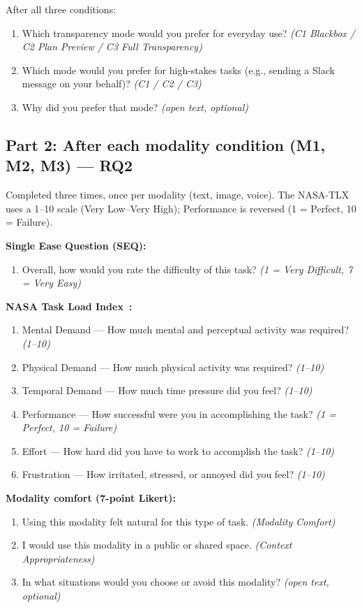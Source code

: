 \documentclass[sigconf, anonymous]{acmart}
\begin{document}
After all three conditions:
\begin{enumerate}
  \item[8.] Which transparency mode would you prefer for everyday use? \emph{(C1 Blackbox / C2 Plan Preview / C3 Full Transparency)}
  \item[9.] Which mode would you prefer for high-stakes tasks (e.g., sending a Slack message on your behalf)? \emph{(C1 / C2 / C3)}
  \item[10.] Why did you prefer that mode? \emph{(open text, optional)}
\end{enumerate}

\subsection*{Part 2: After each modality condition (M1, M2, M3) --- RQ2}

Completed three times, once per modality (text, image, voice). The NASA-TLX uses a 1--10 scale (Very Low--Very High); Performance is reversed (1 = Perfect, 10 = Failure).

\textbf{Single Ease Question (SEQ):}
\begin{enumerate}
  \item Overall, how would you rate the difficulty of this task? \emph{(1 = Very Difficult, 7 = Very Easy)}
\end{enumerate}

\textbf{NASA Task Load Index~\cite{Hart1988}:}
\begin{enumerate}
  \item[2.] Mental Demand --- How much mental and perceptual activity was required? \emph{(1--10)}
  \item[3.] Physical Demand --- How much physical activity was required? \emph{(1--10)}
  \item[4.] Temporal Demand --- How much time pressure did you feel? \emph{(1--10)}
  \item[5.] Performance --- How successful were you in accomplishing the task? \emph{(1 = Perfect, 10 = Failure)}
  \item[6.] Effort --- How hard did you have to work to accomplish the task? \emph{(1--10)}
  \item[7.] Frustration --- How irritated, stressed, or annoyed did you feel? \emph{(1--10)}
\end{enumerate}

\textbf{Modality comfort (7-point Likert):}
\begin{enumerate}
  \item[8.] Using this modality felt natural for this type of task. \emph{(Modality Comfort)}
  \item[9.] I would use this modality in a public or shared space. \emph{(Context Appropriateness)}
  \item[--] In what situations would you choose or avoid this modality? \emph{(open text, optional)}
\end{enumerate}
\end{document}
